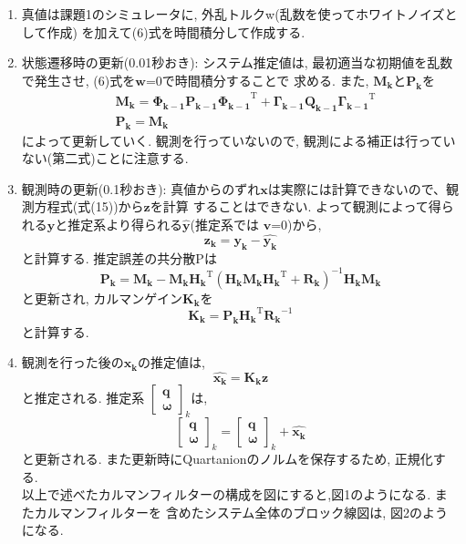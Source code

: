 \documentclass[dvipdfmx, fleqn, uplatex, a4paper]{jsarticle}
\begin{document}
\begin{enumerate}
  \item 真値は課題1のシミュレータに, 外乱トルクw(乱数を使ってホワイトノイズとして作成)
  を加えて(6)式を時間積分して作成する.
  \item 状態遷移時の更新(0.01秒おき): システム推定値は, 最初適当な初期値を乱数で発生させ, (6)式を$\bm{w}$=0で時間積分することで
  求める. また, $\bm{M_k}$と$\bm{P_k}$を
  \begin{align}
    &\bm{M_k} = \bm{\Phi_{k-1}} \bm{P_{k-1}} {\bm{\Phi_{k-1}}}^{\mathrm{T}} +
    \bm{\Gamma_{k-1}} \bm{Q_{k-1}} {\bm{\Gamma_{k-1}}}^{\mathrm{T}} \\
    &\bm{P_k} = \bm{M_k}
  \end{align}
  によって更新していく. 観測を行っていないので, 観測による補正は行っていない(第二式)ことに注意する.
  \item 観測時の更新(0.1秒おき): 真値からのずれ$\bm{x}$は実際には計算できないので、観測方程式(式(15))から$\bm{z}$を計算
  することはできない. よって観測によって得られる$\bm{y}$と推定系より得られる$\hat{\bm{y}}$(推定系では
  $\bm{v}$=0)から,
  \begin{equation}
    \bm{z_k} = \bm{y_k} - \hat{\bm{y_k}}
  \end{equation}
  と計算する. 推定誤差の共分散Pは
  \begin{equation}
    \bm{P_k} = \bm{M_k} - \bm{M_k}{\bm{H_k}}^{\mathrm{T}}{(\bm{H_k}\bm{M_k}{\bm{H_k}}^{\mathrm{T}} + \bm{R_k})}^{-1}
    \bm{H_k}\bm{M_k}
  \end{equation}
  と更新され, カルマンゲイン$\bm{K_k}$を
  \begin{equation}
    \bm{K_k} = \bm{P_k}{\bm{H_k}}^{\mathrm{T}}{\bm{R_k}}^{-1}
  \end{equation}
  と計算する.
  \item 観測を行った後の$\bm{x_k}$の推定値は,
  \begin{equation}
    \hat{\bm{x_k}} = \bm{K_k}\bm{z}
  \end{equation}
  と推定される. 推定系
  $
  {\begin{bmatrix}
    \bm{q} \\
    \bm{\omega}
  \end{bmatrix}}_k
  $は,
  \begin{equation}
    {\begin{bmatrix}
      \bm{q} \\
      \bm{\omega}
    \end{bmatrix}}_k =
    {\begin{bmatrix}
      \bm{q} \\
      \bm{\omega}
    \end{bmatrix}}_k + \hat{\bm{x_k}}
  \end{equation}
  と更新される. また更新時にQuartanionのノルムを保存するため, 正規化する. \\
  以上で述べたカルマンフィルターの構成を図にすると,図1のようになる. またカルマンフィルターを
  含めたシステム全体のブロック線図は, 図2のようになる.


\end{enumerate}
\end{document}
